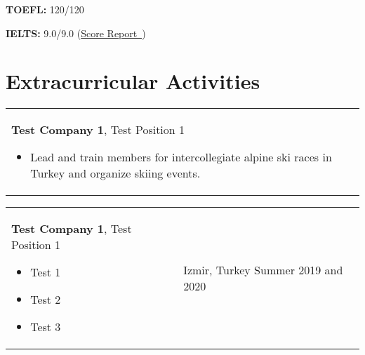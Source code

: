 \documentclass[10pt, a4paper]{article}
\newenvironment{highlights}{
        \begin{itemize}[
                topsep=0pt,
                parsep=0.07 cm,
                partopsep=0pt,
                itemsep=0pt,
                after=\vspace*{-1\baselineskip},
                leftmargin=0.6 cm + 3pt
            ]
    }{
        \end{itemize}
    } %
\newcommand{\hrefExternal}[2]{\href{#1}{#2\, \raisebox{.1ex}{\footnotesize \faExternalLink*}}} %
\begin{document}
            \textbf{TOEFL:} 120/120

            \setlength{\leftskip}{0cm}
            \setlength{\rightskip}{0cm}

        \vspace*{0.12 cm}
        
            \setlength{\leftskip}{0.2 cm}
            \setlength{\rightskip}{0.2 cm}

            \textbf{IELTS:} 9.0/9.0 (\hrefExternal{https://example.com/}{Score Report})

            \setlength{\leftskip}{0cm}
            \setlength{\rightskip}{0cm}



    \section{Extracurricular Activities}
    
        \begin{tabularx}{\textwidth}{K{0.2 cm} R{3.6 cm}}
            \textbf{Test Company 1}, Test Position 1
            \vspace*{0.12 cm}
            \begin{highlights}
                \item Lead and train members for intercollegiate alpine ski races in Turkey and organize skiing events.
            \end{highlights}
        &
            \end{tabularx}

        \vspace*{0.12 cm}
        
        \begin{tabularx}{\textwidth}{K{0.2 cm} R{3.6 cm}}
            \textbf{Test Company 1}, Test Position 1
            \vspace*{0.12 cm}
            \begin{highlights}
                \item Test 1
                \item Test 2
                \item Test 3
            \end{highlights}
        &
            Izmir, Turkey  \hspace*{-0.2cm + 0.2 cm} \newline
            Summer 2019 and 2020 \hspace*{-0.2cm + 0.2 cm}
        \end{tabularx}
\end{document}
